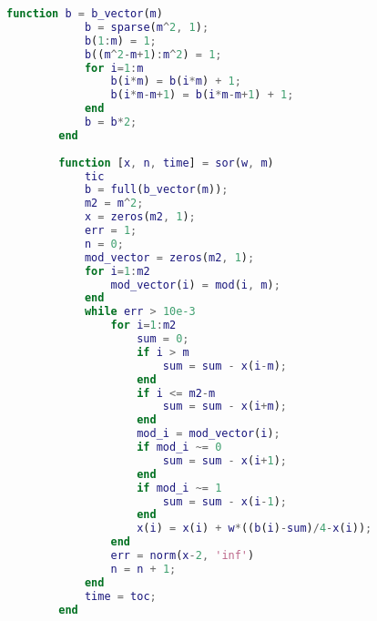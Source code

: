 \documentclass{article}
\begin{document}
        \begin{lstlisting}[language=Matlab]
        function b = b_vector(m)
            b = sparse(m^2, 1);
            b(1:m) = 1;
            b((m^2-m+1):m^2) = 1;
            for i=1:m
                b(i*m) = b(i*m) + 1;
                b(i*m-m+1) = b(i*m-m+1) + 1;
            end
            b = b*2;
        end
        
        function [x, n, time] = sor(w, m)
            tic
            b = full(b_vector(m));
            m2 = m^2;
            x = zeros(m2, 1);
            err = 1;
            n = 0;
            mod_vector = zeros(m2, 1);
            for i=1:m2
                mod_vector(i) = mod(i, m);
            end
            while err > 10e-3
                for i=1:m2
                    sum = 0;
                    if i > m
                        sum = sum - x(i-m);
                    end
                    if i <= m2-m
                        sum = sum - x(i+m);
                    end
                    mod_i = mod_vector(i);
                    if mod_i ~= 0
                        sum = sum - x(i+1);
                    end
                    if mod_i ~= 1
                        sum = sum - x(i-1);
                    end
                    x(i) = x(i) + w*((b(i)-sum)/4-x(i));
                end
                err = norm(x-2, 'inf')
                n = n + 1;
            end
            time = toc;
        end
        \end{lstlisting}
\end{document}
